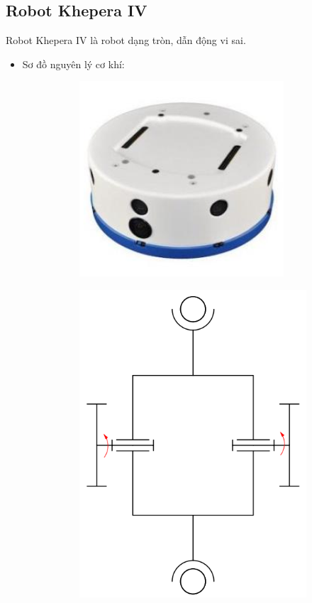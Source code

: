     \subsection{Robot Khepera IV}
    \hspace*{0.6cm} Robot Khepera IV là robot dạng tròn, dẫn động vi sai.
    \begin{itemize}
        \item Sơ đồ nguyên lý cơ khí:
        \begin{figure}[H]
            \begin{subfigure}{0.5\textwidth}
            \centering
            \includegraphics[width=0.6\linewidth, right]{pictures/chapter1/chapter1_pic14a_kheperaIV.png} 
            \label{chap1_pic14a}
            \end{subfigure}
            \begin{subfigure}{0.6\textwidth}
            \includegraphics[width=0.5\linewidth]{pictures/chapter1/chapter1_pic14b_kheperaIV.png}
            \label{chap1_pic14b}

\end{subfigure}
\end{figure}
\end{itemize}
